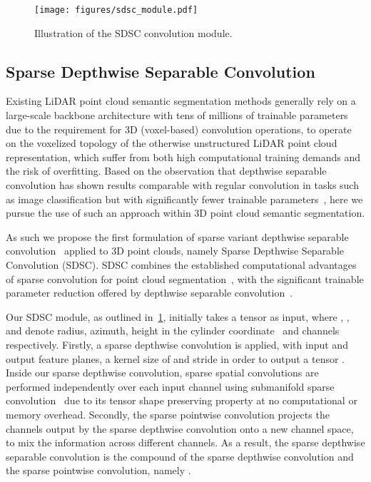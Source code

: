 \documentclass[10pt,twocolumn,letterpaper]{article}
\begin{document}
\begin{figure}[thp]
    \hspace{-0.48cm}
    \centering
    \texttt{[image: figures/sdsc\_module.pdf]}
    \caption{Illustration of the SDSC convolution module.}
    \label{fig:sdsc_module}
    \vspace{-0.5cm}
\end{figure}





\subsection{Sparse Depthwise Separable Convolution}
\label{sec:sdsc}


\noindent
Existing LiDAR point cloud semantic segmentation methods generally rely on a large-scale backbone architecture with tens of millions of trainable parameters ~\cite{hu2020randlanet,hou2022pointtovoxel,jaritz2021xmuda,Unal_2022_CVPR,yi2021complete,zhu2021cylindrical} due to the requirement for 3D (voxel-based) convolution operations, to operate on the voxelized topology of the otherwise unstructured LiDAR point cloud representation, which suffer from both high computational training demands and the risk of overfitting. Based on the observation that depthwise separable convolution has shown results comparable with regular convolution in tasks such as image classification but with significantly fewer trainable parameters~\cite{chollet2017xception,howard2017mobilenets,sandler2018mobilenetv2,tan2019efficientnet,masters2021making,howard2019searching}, here we pursue the use of such an approach within 3D point cloud semantic segmentation.



As such we propose the first formulation of sparse variant depthwise separable convolution~\cite{howard2017mobilenets} applied to 3D point clouds, namely Sparse Depthwise Separable Convolution (SDSC). SDSC combines the established computational advantages of sparse convolution for point cloud segmentation~\cite{graham20183d}, with the significant trainable parameter reduction offered by depthwise separable convolution~\cite{chollet2017xception}. 


Our SDSC module, as outlined in~\cref{fig:sdsc_module}, initially takes a tensor  as input, where , ,  and  denote radius, azimuth, height in the cylinder coordinate~\cite{zhu2021cylindrical} and channels respectively. Firstly, a sparse depthwise convolution  is applied, with  input and output feature planes, a kernel size of  and stride  in order to output a tensor . Inside our sparse depthwise convolution,  sparse spatial convolutions are performed independently over each input channel using submanifold sparse convolution~\cite{graham20183d} due to its tensor shape preserving property at no computational or memory overhead. Secondly, the sparse pointwise convolution  projects the channels output  by the sparse depthwise convolution onto a new channel space, to mix the information across different channels. As a result, the sparse depthwise separable convolution  is the compound of the sparse depthwise convolution and the sparse pointwise convolution, namely .
\end{document}
